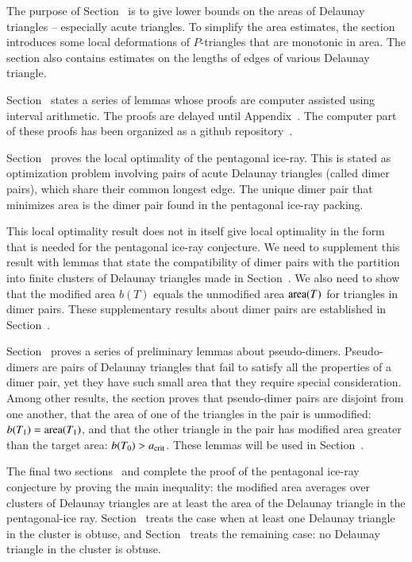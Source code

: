 The purpose of Section~ is to give lower bounds
on the areas of Delaunay triangles -- especially acute triangles.
To simplify the area estimates, 
the section introduces some local deformations of $P$-triangles that
are monotonic in area.  The section also contains estimates on
the lengths of edges of various Delaunay triangle.

Section~ states a series of lemmas whose proofs are
computer assisted using interval arithmetic.  The proofs are delayed until 
Appendix~.  The computer part of these proofs has
been organized as a github repository~\cite{Git}.

Section~ proves the local optimality of the
pentagonal ice-ray.  This is stated as optimization problem involving
pairs of acute Delaunay triangles (called dimer pairs), which share
their common longest edge.  The unique dimer pair that minimizes area
is the dimer pair found in the pentagonal ice-ray packing.

This local optimality result does not in itself give local optimality
in the form that is needed for the pentagonal ice-ray conjecture.  We
need to supplement this result with lemmas that state the
compatibility of dimer pairs with the partition into finite clusters
of Delaunay triangles made in Section~.  We also need
to show that the modified area $b(T)$ equals the unmodified area
${\operatorname{area}}(T)$ for triangles in dimer pairs.  These supplementary
results about dimer pairs are established in
Section~.

Section~ proves a series of preliminary lemmas about
pseudo-dimers.  Pseudo-dimers are pairs of Delaunay triangles that
fail to satisfy all the properties of a dimer pair, yet they have such
small area that they require special consideration.  Among other
results, the section proves that pseudo-dimer pairs are disjoint from
one another, that the area of one of the triangles in the pair is
unmodified: $b(T_1)={\operatorname{area}}(T_1)$, and that the other triangle in the
pair has modified area greater than the target area: $b(T_0)>a_\text{crit}$.
These lemmas will be used in Section~.

The final two sections~ and 
complete the proof of the pentagonal ice-ray conjecture by proving the
main inequality: the modified area averages over clusters of Delaunay
triangles are at least the area of the Delaunay triangle in the
pentagonal-ice ray.  Section~ treats the case when at
least one Delaunay triangle in the cluster is obtuse, and
Section~ treats the remaining case: no Delaunay
triangle in the cluster is obtuse.

